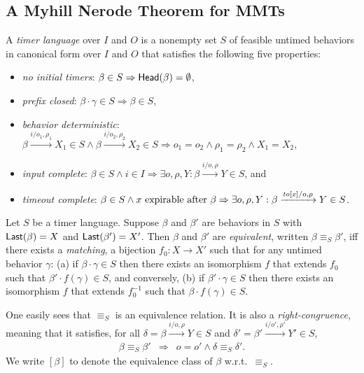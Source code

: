 \subsection{A Myhill Nerode Theorem for MMTs}

\begin{definition}
\label{def:timer language}
A \emph{timer language} over $I$ and $O$ is a nonempty set 
$S$ of feasible untimed behaviors in canonical form over $I$ and $O$ that satisfies the following five properties:
\begin{itemize}
\item
\emph{no initial timers}: $\beta \in S \Rightarrow \mathsf{Head}({\beta}) = \emptyset$,
\item
\emph{prefix closed}: $\beta \cdot \gamma \in S \Rightarrow \beta \in S$,
\item
\emph{behavior deterministic}:
$\beta \xrightarrow{i/o_1, \rho_1} X_1 \in S \wedge \beta \xrightarrow{i/o_2, \rho_2} X_2 \in S \Rightarrow o_1 = o_2 \wedge \rho_1 = \rho_2 \wedge X_1 = X_2$,
\item
\emph{input complete}:
$\beta \in S \wedge i \in I \Rightarrow \exists o, \rho, Y : \beta \xrightarrow{i/o, \rho} Y \in S$,
and
\item
\emph{timeout complete}:
$\beta \in S \wedge x \mbox{ expirable after } \beta \Rightarrow
\exists o, \rho, Y: \beta \xrightarrow{\mathit{to}[x]/o, \rho} Y \in S$.
\end{itemize}
\end{definition}

\begin{definition}
\label{def:nerode}
Let $S$ be a timer language.
Suppose $\beta$ and $\beta'$ are behaviors in $S$ with $\mathsf{Last}({\beta}) = X$ and $\mathsf{Last}({\beta'}) = X'$.
Then $\beta$ and $\beta'$ are \emph{equivalent}, written $\beta \equiv_S \beta'$, iff there exists a \emph{matching}, a bijection
$f_0 : X \to X'$ such that for any untimed behavior $\gamma$:
(a) if $\beta \cdot \gamma \in S$ then there exists an isomorphism $f$ that extends $f_0$ such that $\beta' \cdot f(\gamma) \in S$, and conversely,
(b) if $\beta' \cdot \gamma \in S$ then there exists an isomorphism $f$ that extends $f_0^{-1}$ such that $\beta \cdot f(\gamma) \in S$.
\end{definition}

One easily sees that $\equiv_S$ is an equivalence relation. It is also a \emph{right-congruence}, meaning that it satisfies,
for all $\delta = \beta \xrightarrow{i/o, \rho} Y \in S$ and $\delta' = \beta' \xrightarrow{i/o', \rho'} Y' \in S$,
\begin{eqnarray*}
\beta \equiv_S \beta' & \Rightarrow & o = o' \wedge \delta \equiv_S \delta'.
\end{eqnarray*}
We write $[\beta]$ to denote the equivalence class of $\beta$ w.r.t.\  $\equiv_S$.

